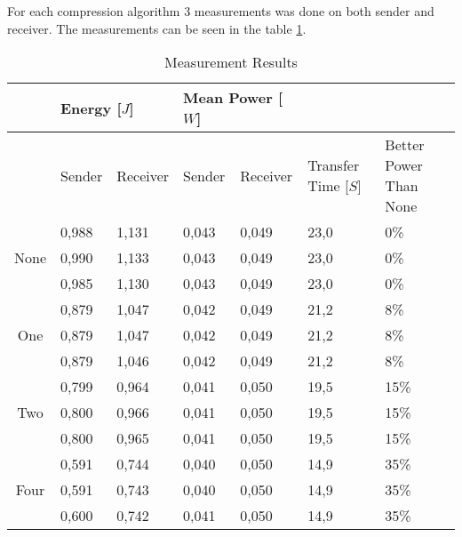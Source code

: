 For each compression algorithm 3 measurements was done on both sender and receiver. 
The measurements can be seen in the table \ref{tab:MeasurementResults}.


\begin{table}[h]
	\begin{tabular}{cllllll}

	\cline{2-5} 
	\multicolumn{1}{l}{} 	& \multicolumn{2}{l}{Energy {[$J$]}} & \multicolumn{2}{l}{Mean Power [$W$]} &	&	\\ \hline
	\rowcolor{gr}
	\multicolumn{1}{l}{Bit Removed}	& Sender	& Receiver	& Sender	& Receiver	& \multicolumn{1}{l}{Transfer Time [$S$]} & \multicolumn{1}{l}{Better Power Than None} \\ \hline
	\multicolumn{1}{c}{\multirow{3}{*}{None}} & 0,988	& 1,131	& 0,043	& 0,049	& \multicolumn{1}{l}{23,0}	& \multicolumn{1}{l}{0\%}	\\  
	\multicolumn{1}{c}{}	& 0,990	& 1,133	& 0,043	& 0,049	& \multicolumn{1}{l}{23,0}	& \multicolumn{1}{l}{0\%}	\\ 
	\multicolumn{1}{c}{}	& 0,985	& 1,130	& 0,043	& 0,049	& \multicolumn{1}{l}{23,0}	& \multicolumn{1}{l}{0\%}	\\ \hline
	\multicolumn{1}{c}{\multirow{3}{*}{One}}  & 0,879	& 1,047	& 0,042	& 0,049	& \multicolumn{1}{l}{21,2}	& \multicolumn{1}{l}{8\%}	\\ %
	\multicolumn{1}{c}{}	& 0,879	& 1,047	& 0,042	& 0,049	& \multicolumn{1}{l}{21,2}	& \multicolumn{1}{l}{8\%}	\\ %
	\multicolumn{1}{c}{}	& 0,879	& 1,046	& 0,042	& 0,049	& \multicolumn{1}{l}{21,2}	& \multicolumn{1}{l}{8\%}	\\ \hline
	\multicolumn{1}{c}{\multirow{3}{*}{Two}}  & 0,799	& 0,964	& 0,041	& 0,050	& \multicolumn{1}{l}{19,5}	& \multicolumn{1}{l}{15\%}	\\ %
	\multicolumn{1}{c}{}	& 0,800	& 0,966	& 0,041	& 0,050	& \multicolumn{1}{l}{19,5}	& \multicolumn{1}{l}{15\%}	\\ %
	\multicolumn{1}{c}{}	& 0,800	& 0,965	& 0,041	& 0,050	& \multicolumn{1}{l}{19,5}	& \multicolumn{1}{l}{15\%}	\\ \hline
	\multicolumn{1}{c}{\multirow{3}{*}{Four}} & 0,591	& 0,744	& 0,040	& 0,050	& \multicolumn{1}{l}{14,9}	& \multicolumn{1}{l}{35\%}	\\ %
	\multicolumn{1}{c}{}	& 0,591 & 0,743	& 0,040	& 0,050	& \multicolumn{1}{l}{14,9}	& \multicolumn{1}{l}{35\%}	\\ %
	\multicolumn{1}{c}{}	& 0,600 & 0,742	& 0,041	& 0,050	& \multicolumn{1}{l}{14,9}	& \multicolumn{1}{l}{35\%}	\\ \hline
	\end{tabular}

	\caption{Measurement Results }
	\label{tab:MeasurementResults}
\end{table}
